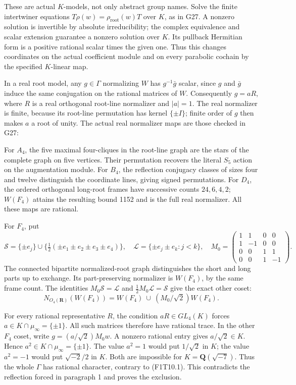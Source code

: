 These are actual \(K\)-models, not only abstract group names.
Solve the finite intertwiner equations
\(T\rho(w)=\rho_{\mathrm{root}}(w)T\) over \(K\), as in
G27. A nonzero solution is invertible by absolute irreducibility;
the complex equivalence and scalar extension guarantee a nonzero
solution over \(K\). Its pullback Hermitian form is a positive
rational scalar times the given one. Thus this changes
coordinates on the actual coefficient module and on every
parabolic cochain by the specified \(K\)-linear map.

In a real root model, any \(g\in\Gamma\) normalizing \(W\)
has \(g^{-1}\bar g\) scalar, since \(g\) and \(\bar g\)
induce the same conjugation on the rational matrices of \(W\).
Consequently \(g=aR\), where \(R\) is a real orthogonal
root-line normalizer and \(|a|=1\). The real normalizer is
finite, because its root-line permutation has kernel
\(\{\pm I\}\); finite order of \(g\) then makes \(a\) a root
of unity. The actual real normalizer maps are those checked
in G27:

For \(A_4\), the five maximal four-cliques in the root-line
graph are the stars of the complete graph on five vertices.
Their permutation recovers the literal \(S_5\) action on
the augmentation module. For \(B_4\), the reflection
conjugacy classes of sizes four and twelve distinguish the
coordinate lines, giving signed permutations. For \(D_4\),
the ordered orthogonal long-root frames have successive
counts \(24,6,4,2\); \(W(F_4)\) attains the resulting bound
1152 and is the full real normalizer. All these maps are
rational.

For \(F_4\), put
\[
 \mathcal S=\{\pm e_j\}\cup
       \{\tfrac12(\pm e_1\pm e_2\pm e_3\pm e_4)\},
 \quad
 \mathcal L=\{\pm e_j\pm e_k:j<k\},
 \quad
 M_0=\begin{pmatrix}
 1&1&0&0\\1&-1&0&0\\0&0&1&1\\0&0&1&-1
 \end{pmatrix}.
 \tag{F1T10.9}
\]
The connected bipartite normalized-root graph distinguishes
the short and long parts up to exchange. Its part-preserving
normalizer is \(W(F_4)\), by the same frame count.
The identities \(M_0\mathcal S=\mathcal L\) and
\(\frac12M_0\mathcal L=\mathcal S\) give the exact other coset:
\[
 N_{O_4(\mathbf R)}(W(F_4))
        =W(F_4)\ \cup\ (M_0/\sqrt2)W(F_4).
 \tag{F1T10.10}
\]

For every rational representative \(R\), the condition
\(aR\in GL_4(K)\) forces \(a\in K\cap\mu_\infty=\{\pm1\}\).
All such matrices therefore have rational trace. In the other
\(F_4\) coset, write \(g=(a/\sqrt2)M_0w\). A nonzero
rational entry gives \(a/\sqrt2\in K\). Hence
\(a^2\in K\cap\mu_\infty=\{\pm1\}\).
The value \(a^2=1\) would put \(1/\sqrt2\) in \(K\); the
value \(a^2=-1\) would put \(\sqrt{-2}/2\) in \(K\).
Both are impossible for \(K=\mathbf Q(\sqrt{-7})\).
Thus the whole \(\Gamma\) has rational character, contrary
to (F1T10.1). This contradicts the reflection forced in
paragraph 1 and proves the exclusion.

